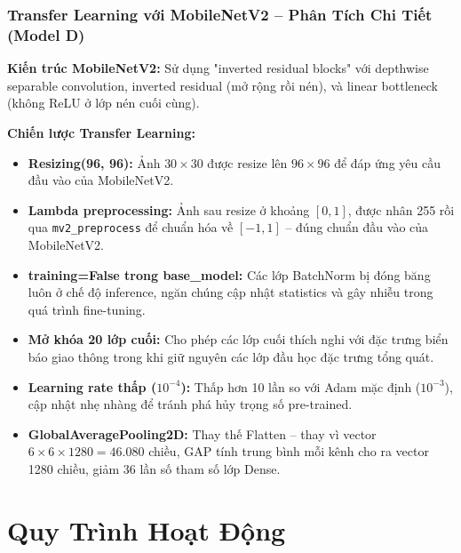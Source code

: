 \documentclass[12pt,a4paper]{article}
\begin{document}
\subsubsection*{Transfer Learning với MobileNetV2 -- Phân Tích Chi Tiết (Model D)}

\textbf{Kiến trúc MobileNetV2:} Sử dụng "inverted residual blocks" với depthwise separable convolution, inverted residual (mở rộng rồi nén), và linear bottleneck (không ReLU ở lớp nén cuối cùng).

\textbf{Chiến lược Transfer Learning:}
\begin{itemize}
    \item \textbf{Resizing(96, 96):} Ảnh $30\times30$ được resize lên $96\times96$ để đáp ứng yêu cầu đầu vào của MobileNetV2.
    \item \textbf{Lambda preprocessing:} Ảnh sau resize ở khoảng $[0,1]$, được nhân 255 rồi qua \texttt{mv2\_preprocess} để chuẩn hóa về $[-1, 1]$ -- đúng chuẩn đầu vào của MobileNetV2.
    \item \textbf{training=False trong base\_model:} Các lớp BatchNorm bị đóng băng luôn ở chế độ inference, ngăn chúng cập nhật statistics và gây nhiễu trong quá trình fine-tuning.
    \item \textbf{Mở khóa 20 lớp cuối:} Cho phép các lớp cuối thích nghi với đặc trưng biển báo giao thông trong khi giữ nguyên các lớp đầu học đặc trưng tổng quát.
    \item \textbf{Learning rate thấp ($10^{-4}$):} Thấp hơn 10 lần so với Adam mặc định ($10^{-3}$), cập nhật nhẹ nhàng để tránh phá hủy trọng số pre-trained.
    \item \textbf{GlobalAveragePooling2D:} Thay thế Flatten -- thay vì vector $6\times6\times1280 = 46.080$ chiều, GAP tính trung bình mỗi kênh cho ra vector 1280 chiều, giảm 36 lần số tham số lớp Dense.
\end{itemize}

\section{Quy Trình Hoạt Động}
\end{document}
